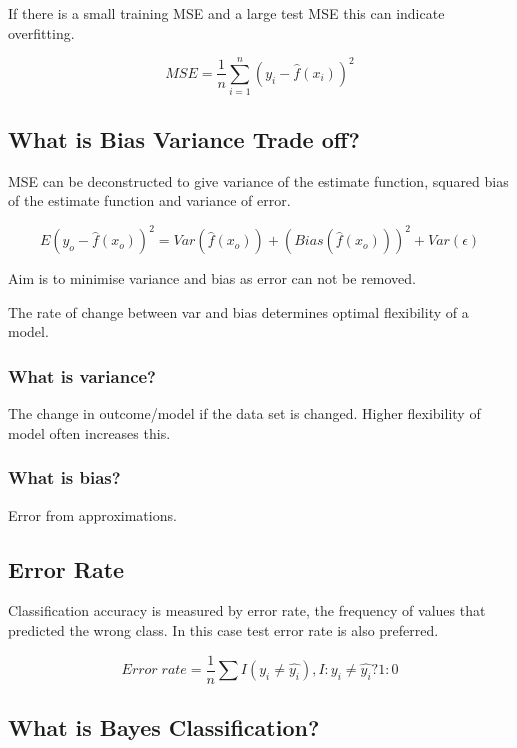 \documentclass[11pt]{scrartcl} %
\begin{document}
If there is a small training MSE and a large test MSE this can indicate overfitting.

\begin{equation}
	MSE = \frac{1}{n}\sum^n_{i=1}{(y_i-\hat{f}(x_i))^2}
\end{equation}

\subsection{What is Bias Variance Trade off?}

MSE can be deconstructed to give variance of the estimate function, squared bias of the estimate function
and variance of error.

\begin{equation}
	E(y_o - \hat{f}(x_o))^2 = Var(\hat{f}(x_o)) + (Bias(\hat{f}(x_o)))^2 + Var(\epsilon)
\end{equation}

Aim is to minimise variance and bias as error can not be removed.

The rate of change between var and bias determines optimal flexibility of a model.

\subsubsection{What is variance?}

The change in outcome/model if the data set is changed. Higher flexibility of model often increases
this.

\subsubsection{What is bias?}

Error from approximations.

\subsection{Error Rate}

Classification accuracy is measured by error rate, the frequency of values that predicted the wrong class. In this
case test error rate is also preferred.

\begin{equation}
	Error\; rate = \frac{1}{n} \sum{I(y_i \neq \hat{y_i})} , I: y_i \neq \hat{y_i} ? 1:0
\end{equation}

\subsection{What is Bayes Classification?}
\end{document}

